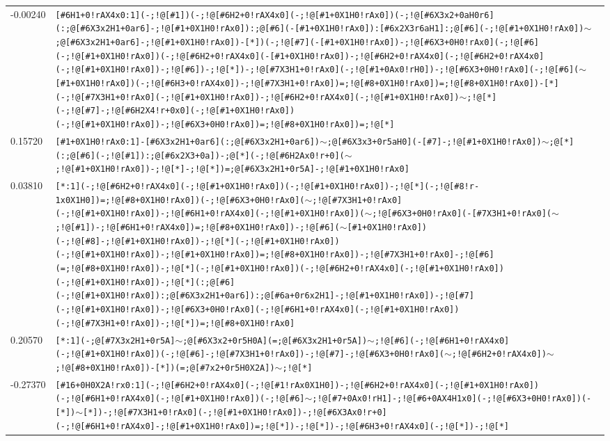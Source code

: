 \begin{longtable}{>{\baselineskip=10pt}p{} >{\baselineskip=10pt}p{}}
-0.00240 & \texttt{[\#6H1+0!rAX4x0:1](-;!@[\#1])(-;!@[\#6H2+0!rAX4x0](-;!@[\#1+0X1H0!rAx0])(-;!@[\#6X3x2+0aH0r6](:;@[\#6X3x2H1+0ar6]-;!@[\#1+0X1H0!rAx0]):;@[\#6](-[\#1+0X1H0!rAx0]):[\#6x2X3r6aH1]:;@[\#6](-;!@[\#1+0X1H0!rAx0])$\sim$;@[\#6X3x2H1+0ar6]-;!@[\#1+0X1H0!rAx0])-[*])(-;!@[\#7](-[\#1+0X1H0!rAx0])-;!@[\#6X3+0H0!rAx0](-;!@[\#6](-;!@[\#1+0X1H0!rAx0])(-;!@[\#6H2+0!rAX4x0](-[\#1+0X1H0!rAx0])-;!@[\#6H2+0!rAX4x0](-;!@[\#6H2+0!rAX4x0](-;!@[\#1+0X1H0!rAx0])-;!@[\#6])-;!@[*])-;!@[\#7X3H1+0!rAx0](-;!@[\#1+0Ax0!rH0])-;!@[\#6X3+0H0!rAx0](-;!@[\#6]($\sim$[\#1+0X1H0!rAx0])(-;!@[\#6H3+0!rAX4x0])-;!@[\#7X3H1+0!rAx0])=;!@[\#8+0X1H0!rAx0])=;!@[\#8+0X1H0!rAx0])-[*](-;!@[\#7X3H1+0!rAx0](-;!@[\#1+0X1H0!rAx0])-;!@[\#6H2+0!rAX4x0](-;!@[\#1+0X1H0!rAx0])$\sim$;!@[*](-;!@[\#7]-;!@[\#6H2X4!r+0x0](-;!@[\#1+0X1H0!rAx0])(-;!@[\#1+0X1H0!rAx0])-;!@[\#6X3+0H0!rAx0])=;!@[\#8+0X1H0!rAx0])=;!@[*]} \\ 
0.15720 & \texttt{[\#1+0X1H0!rAx0:1]-[\#6X3x2H1+0ar6](:;@[\#6X3x2H1+0ar6])$\sim$;@[\#6X3x3+0r5aH0](-[\#7]-;!@[\#1+0X1H0!rAx0])$\sim$;@[*](:;@[\#6](-;!@[\#1]):;@[\#6x2X3+0a])-;@[*](-;!@[\#6H2Ax0!r+0]($\sim$;!@[\#1+0X1H0!rAx0])-;!@[*]-;!@[*])=;@[\#6X3x2H1+0r5A]-;!@[\#1+0X1H0!rAx0]} \\ 
0.03810 & \texttt{[*:1](-;!@[\#6H2+0!rAX4x0](-;!@[\#1+0X1H0!rAx0])(-;!@[\#1+0X1H0!rAx0])-;!@[*](-;!@[\#8!r-1x0X1H0])=;!@[\#8+0X1H0!rAx0])(-;!@[\#6X3+0H0!rAx0]($\sim$;!@[\#7X3H1+0!rAx0](-;!@[\#1+0X1H0!rAx0])-;!@[\#6H1+0!rAX4x0](-;!@[\#1+0X1H0!rAx0])($\sim$;!@[\#6X3+0H0!rAx0](-[\#7X3H1+0!rAx0]($\sim$;!@[\#1])-;!@[\#6H1+0!rAX4x0])=;!@[\#8+0X1H0!rAx0])-;!@[\#6]($\sim$[\#1+0X1H0!rAx0])(-;!@[\#8]-;!@[\#1+0X1H0!rAx0])-;!@[*](-;!@[\#1+0X1H0!rAx0])(-;!@[\#1+0X1H0!rAx0])-;!@[\#1+0X1H0!rAx0])=;!@[\#8+0X1H0!rAx0])-;!@[\#7X3H1+0!rAx0]-;!@[\#6](=;!@[\#8+0X1H0!rAx0])-;!@[*](-;!@[\#1+0X1H0!rAx0])(-;!@[\#6H2+0!rAX4x0](-;!@[\#1+0X1H0!rAx0])(-;!@[\#1+0X1H0!rAx0])-;!@[*](:;@[\#6](-;!@[\#1+0X1H0!rAx0]):;@[\#6X3x2H1+0ar6]):;@[\#6a+0r6x2H1]-;!@[\#1+0X1H0!rAx0])-;!@[\#7](-;!@[\#1+0X1H0!rAx0])-;!@[\#6X3+0H0!rAx0](-;!@[\#6H1+0!rAX4x0](-;!@[\#1+0X1H0!rAx0])(-;!@[\#7X3H1+0!rAx0])-;!@[*])=;!@[\#8+0X1H0!rAx0]} \\ 
0.20570 & \texttt{[*:1](-;@[\#7X3x2H1+0r5A]$\sim$;@[\#6X3x2+0r5H0A](=;@[\#6X3x2H1+0r5A])$\sim$;!@[\#6](-;!@[\#6H1+0!rAX4x0](-;!@[\#1+0X1H0!rAx0])(-;!@[\#6]-;!@[\#7X3H1+0!rAx0])-;!@[\#7]-;!@[\#6X3+0H0!rAx0]($\sim$;!@[\#6H2+0!rAX4x0])$\sim$;!@[\#8+0X1H0!rAx0])-[*])(=;@[\#7x2+0r5H0X2A])$\sim$;!@[*]} \\ 
-0.27370 & \texttt{[\#16+0H0X2A!rx0:1](-;!@[\#6H2+0!rAX4x0](-;!@[\#1!rAx0X1H0])-;!@[\#6H2+0!rAX4x0](-;!@[\#1+0X1H0!rAx0])(-;!@[\#6H1+0!rAX4x0](-;!@[\#1+0X1H0!rAx0])(-;!@[\#6]$\sim$;!@[\#7+0Ax0!rH1]-;!@[\#6+0AX4H1x0](-;!@[\#6X3+0H0!rAx0])(-[*])$\sim$[*])-;!@[\#7X3H1+0!rAx0](-;!@[\#1+0X1H0!rAx0])-;!@[\#6X3Ax0!r+0](-;!@[\#6H1+0!rAX4x0]-;!@[\#1+0X1H0!rAx0])=;!@[*])-;!@[*])-;!@[\#6H3+0!rAX4x0](-;!@[*])-;!@[*]} \\ 

\end{longtable}
